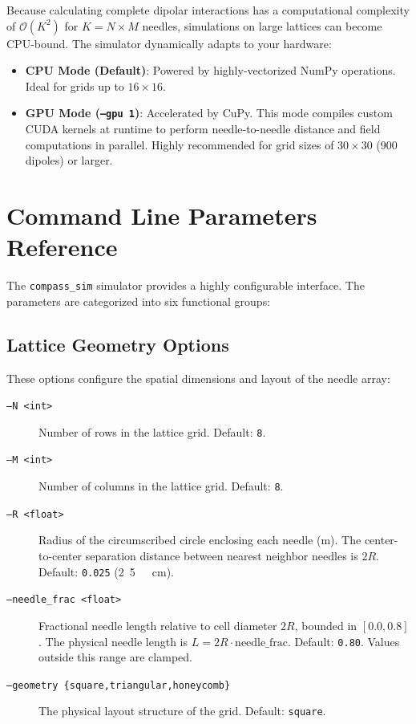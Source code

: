 \documentclass[11pt,a4paper]{article}
\newcommand{\code}[1]{\texttt{#1}}
\begin{document}
Because calculating complete dipolar interactions has a computational complexity of $\mathcal{O}(K^2)$ for $K = N \times M$ needles, simulations on large lattices can become CPU-bound. The simulator dynamically adapts to your hardware:

\begin{itemize}
    \item \textbf{CPU Mode (Default)}: Powered by highly-vectorized NumPy operations. Ideal for grids up to $16 \times 16$.
    \item \textbf{GPU Mode (\code{--gpu 1})}: Accelerated by CuPy. This mode compiles custom CUDA kernels at runtime to perform needle-to-needle distance and field computations in parallel. Highly recommended for grid sizes of $30 \times 30$ (900 dipoles) or larger.
\end{itemize}

\section{Command Line Parameters Reference}
\label{sec:parameters}

The \code{compass\_sim} simulator provides a highly configurable interface. The parameters are categorized into six functional groups:

\subsection{Lattice Geometry Options}
These options configure the spatial dimensions and layout of the needle array:
\begin{description}
    \item[\code{--N <int>}] Number of rows in the lattice grid. Default: \code{8}.
    \item[\code{--M <int>}] Number of columns in the lattice grid. Default: \code{8}.
    \item[\code{--R <float>}] Radius of the circumscribed circle enclosing each needle (\si{m}). The center-to-center separation distance between nearest neighbor needles is $2R$. Default: \code{0.025} (\si{2.5\ cm}).
    \item[\code{--needle\_frac <float>}] Fractional needle length relative to cell diameter $2R$, bounded in $[0.0, 0.8]$. The physical needle length is $L = 2R \cdot \text{needle\_frac}$. Default: \code{0.80}. Values outside this range are clamped.
    \item[\code{--geometry \{square,triangular,honeycomb\}}] The physical layout structure of the grid. Default: \code{square}.
\end{description}
\end{document}
